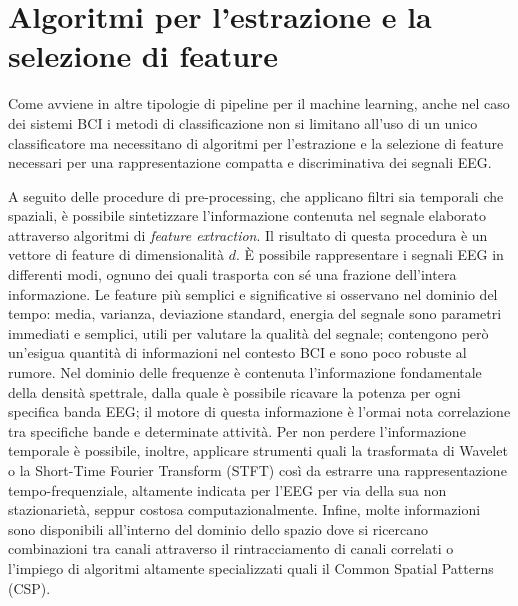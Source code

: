 \section{Algoritmi per l’estrazione e la selezione di feature}
Come avviene in altre tipologie di pipeline per il machine learning, anche nel caso dei sistemi BCI i metodi di classificazione non si limitano all’uso di un unico classificatore ma necessitano di algoritmi per l’estrazione e la selezione di feature necessari per una rappresentazione compatta e discriminativa dei segnali EEG. 

A seguito delle procedure di pre-processing, che applicano filtri sia temporali che spaziali, è possibile sintetizzare l’informazione contenuta nel segnale elaborato attraverso algoritmi di \emph{feature extraction}. Il risultato di questa procedura è un vettore di feature di dimensionalità $d$. 
È possibile rappresentare i segnali EEG in differenti modi, ognuno dei quali trasporta con sé una frazione dell’intera informazione. 
Le feature più semplici e significative si osservano nel dominio del tempo: media, varianza, deviazione standard, energia del segnale sono parametri immediati e semplici, utili per valutare la qualità del segnale; contengono però un’esigua quantità di informazioni nel contesto BCI e sono poco robuste al rumore. 
Nel dominio delle frequenze è contenuta l’informazione fondamentale della densità spettrale, dalla quale è possibile ricavare la potenza per ogni specifica banda EEG; il motore di questa informazione è l'ormai nota correlazione tra specifiche bande e determinate attività. 
Per non perdere l’informazione temporale è possibile, inoltre, applicare strumenti quali la trasformata di Wavelet o la Short-Time Fourier Transform (STFT) così da estrarre una rappresentazione tempo-frequenziale, altamente indicata per l’EEG per via della sua non stazionarietà, seppur costosa computazionalmente. Infine, molte informazioni sono disponibili all’interno del dominio dello spazio dove si ricercano combinazioni tra canali attraverso il rintracciamento di canali correlati o l’impiego di algoritmi altamente specializzati quali il Common Spatial Patterns (CSP).

